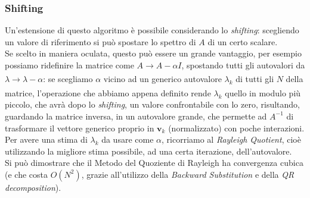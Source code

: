 \subsubsection{Shifting}
Un'estensione di questo algoritmo è possibile considerando lo \textit{shifting}: scegliendo un valore di riferimento si può spostare lo spettro di $A$ di un certo scalare.\\
Se scelto in maniera oculata, questo può essere un grande vantaggio, per esempio possiamo ridefinire la matrice come $A \xrightarrow[]{}A - \alpha I$, spostando tutti gli autovalori da $\lambda \xrightarrow[]{}\lambda - \alpha$: se scegliamo $\alpha$ vicino ad un generico autovalore $\lambda_k$ di tutti gli $N$ della matrice, l'operazione che abbiamo appena definito rende $\lambda_k$ quello in modulo più piccolo, che avrà dopo lo \textit{shifting}, un valore confrontabile con lo zero, risultando, guardando la matrice inversa, in un autovalore grande, che permette ad $A^{-1}$ di trasformare il vettore generico proprio in $\boldsymbol{v}_k$ (normalizzato) con poche interazioni.\\
Per avere una stima di $\lambda_k$ da usare come $\alpha$, ricorriamo al \textit{Rayleigh Quotient}, cioè utilizzando la migliore stima possibile, ad una certa iterazione, dell'autovalore.\\
\noindent Si può dimostrare che il Metodo del Quoziente di Rayleigh ha convergenza cubica (e che costa $O(N^2)$, grazie all'utilizzo della \textit{Backward Substitution} e della \textit{QR decomposition}).


